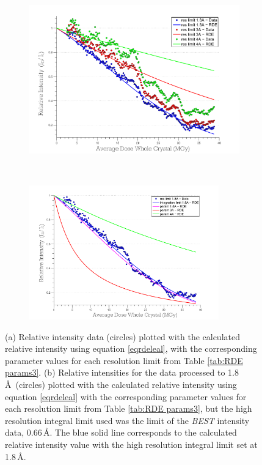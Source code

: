 \begin{figure}[H]
    \centering
    \begin{subfigure}[b]{0.9\textwidth}
        \centering
        \includegraphics[width=\textwidth]{figures/dwd/rescmpplot1.pdf}
        \caption{}
        \label{fig:Resolution comparison plot - scaled to diff res}
    \end{subfigure}
			\\
    \begin{subfigure}[b]{1\textwidth}
        \centering
        \includegraphics[width=0.9\textwidth]{figures/dwd/rescmpplot3.pdf}
        \caption{}
        \label{fig:Resolution comparison plot - integrated to diff res}
    \end{subfigure}
	\caption[Effects of resolution cut offs on Leal \textit{et al.} model.]{(a) Relative intensity data (circles) plotted with the calculated relative intensity using equation \ref{eqrdeleal}, with the corresponding parameter values for each resolution limit from Table \ref{tab:RDE params3}.
	(b) Relative intensities for the data processed to 1.8\,\AA\ (circles) plotted with the calculated relative intensity using equation \ref{eqrdeleal} with the corresponding parameter values for each resolution limit from Table \ref{tab:RDE params3}, but the high resolution integral limit used was the limit of the \emph{BEST} intensity data, 0.66$\,$\AA.
	The blue solid line corresponds to the calculated relative intensity value with the high resolution integral limit set at 1.8$\,$\AA.}
	\label{figrescont1}
\end{figure}
